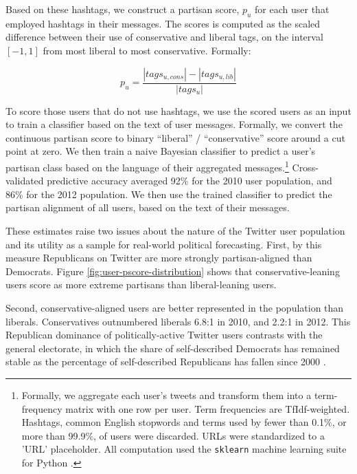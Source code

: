 \documentclass{article}
\begin{document}
Based on these hashtags, we construct a partisan score, $p_u$ for each
user that employed hashtags in their messages. The scores is computed
as the scaled difference between their use of conservative and liberal
tags, on the interval $[-1, 1]$ from most liberal to most
conservative. Formally:

 \begin{equation}
   \label{eq:pscore}
   p_u = \frac{\left|tags_{u,cons}\right| - \left|tags_{u, lib}\right|}{\left|tags_u\right|}
 \end{equation}

To score those users that do not use hashtags, we use the scored users
as an input to train a classifier based on the text of user
messages. Formally, we convert the continuous partisan score to binary
``liberal'' / ``conservative'' score around a cut point at zero. We
then train a naive Bayesian classifier to predict a user's
partisan class based on the language of their aggregated
messages.\footnote{Formally, we aggregate each user's tweets and
transform them into a term-frequency matrix with one row per
user. Term frequencies are TfIdf-weighted. Hashtags,
common English stopwords and terms used by fewer than 0.1\%, or more
than 99.9\%, of users were discarded. URLs were standardized to a
'URL' placeholder. All computation used the \texttt{sklearn} machine
learning suite for Python \citep{scikit-learn}.} Cross-validated
predictive accuracy averaged 92\% for the 2010 user population, and
86\% for the 2012 population. We then use the trained classifier to
predict the partisan alignment of all users, based on the text of
their messages.

These estimates raise two issues about the nature of the Twitter
user population and its utility as a sample for real-world political
forecasting. First, by this measure Republicans on Twitter are more
strongly partisan-aligned than Democrats. Figure
\ref{fig:user-pscore-distribution} shows that conservative-leaning
users score as more extreme partisans than liberal-leaning users.

Second, conservative-aligned users are better represented in the
population than liberals. Conservatives outnumbered liberals 6.8:1 in
2010, and 2.2:1 in 2012. This Republican dominance of
politically-active Twitter users contrasts with the general electorate,
in which the share of self-described Democrats has remained stable as
the percentage of self-described Republicans has fallen since 2000
\cite{pew2012}.
\end{document}
